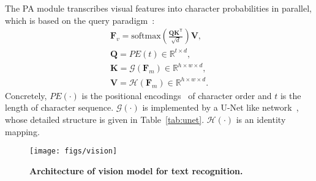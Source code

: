 \documentclass[10pt,journal,compsoc]{IEEEtran}
\begin{document}
The PA module transcribes visual features into character probabilities in parallel, which is based on the query paradigm~\cite{vaswani2017attention}:
\begin{align}
\mathbf{F}_v = \text{softmax}(\frac{\mathbf{Q}\mathbf{K}^\mathsf{T}}{\sqrt{d}})\mathbf{V}, \\
\mathbf{Q} = PE(t) \in \mathbb{R}^{t \times d}, \label{eq:query}\\
\mathbf{K} = \mathcal{G}(\mathbf{F}_m) \in \mathbb{R}^{h \times w \times d}, \\
\mathbf{V} = \mathcal{H}(\mathbf{F}_m) \in \mathbb{R}^{h \times w \times d}.
\end{align}
Concretely, $PE(\cdot)$ is the positional encodings~\cite{vaswani2017attention} of character order and $t$ is the length of character sequence. $\mathcal{G}(\cdot)$ is implemented by a U-Net like network~\cite{ronneberger2015u}, whose detailed structure is given in Table~\ref{tab:unet}. $\mathcal{H}(\cdot)$ is an identity mapping. 



\begin{figure}
   \begin{center}
      \texttt{[image: figs/vision]}
      \caption{\textbf{Architecture of vision model for text recognition.}}
      \label{fig:vision}
   \end{center}
   \vspace{-0.5em}    
\end{figure}
\end{document}
